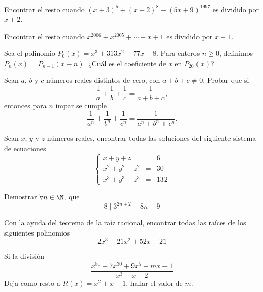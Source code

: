 \begin{section-problem}
    Encontrar el resto cuando $(x + 3)^5 + (x + 2)^8 + (5x + 9)^{1997}$ es dividido por $x + 2$.
\end{section-problem}

\begin{section-problem}
    Encontrar el resto cuando $x^{2006} + x^{2005} + \cdots + x + 1$ es dividido por $x + 1$.
\end{section-problem}

\begin{section-problem}
    Sea el polinomio $P_0(x) = x^3 + 313x^2 - 77x - 8$.
    Para enteros $n \geq 0$, definimos $P_n(x) = P_{n - 1}(x - n)$.
    ¿Cuál es el coeficiente de $x$ en $P_{20}(x)$?
\end{section-problem}

\begin{section-problem}
    Sean $a$, $b$ y $c$ números reales distintos de cero, con $a + b + c \neq 0$.
    Probar que si
    \[\frac{1}{a} + \frac{1}{b} + \frac{1}{c} = \frac{1}{a + b + c},\]
    entonces para $n$ impar se cumple
    \[\frac{1}{a^n} + \frac{1}{b^n} + \frac{1}{c^n} = \frac{1}{a^n + b^n + c^n}.\]
\end{section-problem}

\begin{section-problem}
    Sean $x$, $y$ y $z$ números reales, encontrar todas las soluciones del siguiente sistema de ecuaciones
    \[
        \left\{
        \begin{array}{rcl}
            x + y + z & =& 6\\
            x^2 + y^2 + z^2 & =& 30\\
            x^3 + y^3 + z^3 & =& 132
        \end{array}
        \right.
    \]
\end{section-problem}

\begin{section-problem}
    Demostrar $\forall n \in \N$, que
    \[8 \mid 3^{2n + 2} + 8n - 9\]
\end{section-problem}


\begin{section-problem}
    Con la ayuda del teorema de la raíz racional, encontrar todas las raíces de los siguientes polinomios
    \[2 x^3 - 21 x^2 + 52 x - 21\]
\end{section-problem}

\begin{section-problem}
    Si la división
    \[\frac{x^{80} - 7 x^{30} + 9x^5 - mx + 1}{x^3 + x - 2}\]
    Deja como resto a $R(x) = x^2 + x - 1$, hallar el valor de $m$.
\end{section-problem}

